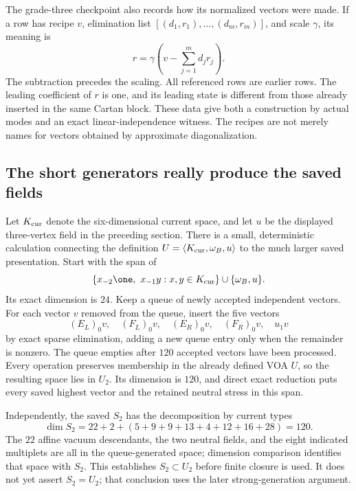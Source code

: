 The grade-three checkpoint also records how its normalized vectors
were made.  If a row has recipe $v$, elimination list
$[(d_1,r_1),\ldots,(d_m,r_m)]$, and scale $\gamma$, its meaning is
\begin{equation}\label{eq:reader-row-recipe}
       r=\gamma\left(v-\sum_{j=1}^m d_jr_j\right).
\end{equation}
The subtraction precedes the scaling.  All referenced rows are earlier
rows.  The leading coefficient of $r$ is one, and its leading state
is different from those already inserted in the same Cartan block.
These data give both a construction by actual modes and an exact
linear-independence witness.  The recipes are not merely names for
vectors obtained by approximate diagonalization.

\subsection{The short generators really produce the saved fields}

Let $K_{\rm cur}$ denote the six-dimensional current space, and let
$u$ be the displayed three-vertex field in the preceding section.
There is a small, deterministic calculation connecting the definition
$U=\langle K_{\rm cur},\omega_B,u\rangle$ to the much larger saved
presentation.  Start with the span of
\[
 \{x_{-2}\one,\ x_{-1}y:x,y\in K_{\rm cur}\}
                   \cup\{\omega_B,u\}.
\]
Its exact dimension is $24$.  Keep a queue of newly accepted independent
vectors.  For each vector $v$ removed from the queue, insert the five
vectors
\[
       (E_L)_0v,\quad(F_L)_0v,\quad(E_R)_0v,\quad(F_R)_0v,
                          \quad u_1v
\]
by exact sparse elimination, adding a new queue entry only when the
remainder is nonzero.  The queue empties after $120$ accepted vectors
have been processed.  Every operation preserves membership in the
already defined VOA $U$, so the resulting space lies in $U_2$.
Its dimension is $120$, and direct exact reduction puts every saved
highest vector and the retained neutral stress in this span.

Independently, the saved $S_2$ has the decomposition by current types
\[
 \dim S_2=22+2+(5+9+9+13+4+12+16+28)=120.
\]
The $22$ affine vacuum descendants, the two neutral fields, and the
eight indicated multiplets are all in the queue-generated space;
dimension comparison identifies that space with $S_2$.
This establishes $S_2\subset U_2$ before finite closure is used.
It does not yet assert $S_2=U_2$; that conclusion uses the later
strong-generation argument.

